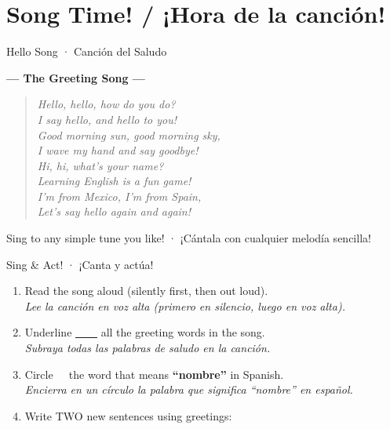 
\section{Song Time! / ¡Hora de la canción!}

\begin{songbox}{Hello Song · Canción del Saludo}
\begin{center}
{\large\bfseries\color{kidsPink} --- The Greeting Song ---}
\end{center}

\medskip
\begin{verse}
\textit{Hello, hello, how do you do?}  \\
\textit{I say hello, and hello to you!} \\
\textit{Good morning sun, good morning sky,} \\
\textit{I wave my hand and say goodbye!} \\[6pt]
\textit{Hi, hi, what's your name?} \\
\textit{Learning English is a fun game!} \\
\textit{I'm from Mexico, I'm from Spain,} \\
\textit{Let's say hello again and again!} \\
\end{verse}

\medskip
\begin{center}
{\color{kidsGray}\small {} Sing to any simple tune you like! · ¡Cántala con cualquier melodía sencilla!}
\end{center}
\end{songbox}

\vspace{14pt}

\begin{activity}{Sing \& Act! · ¡Canta y actúa!}
\begin{enumerate}
  \item Read the song aloud (silently first, then out loud). \\
        \textit{Lee la canción en voz alta (primero en silencio, luego en voz alta).}
  \item Underline \underline{\ \ \ \ } all the greeting words in the song. \\
        \textit{Subraya todas las palabras de saludo en la canción.}
  \item Circle \textcircled{\ } the word that means \textbf{``nombre''} in Spanish. \\
        \textit{Encierra en un círculo la palabra que significa ``nombre'' en español.}
  \item Write TWO new sentences using greetings: \\[6pt]
        \answerline[10cm] \\[10pt]
        \answerline[10cm]
\end{enumerate}
\end{activity}


